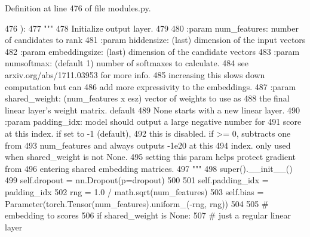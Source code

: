 Definition at line 476 of file modules.\+py.


\begin{DoxyCode}
476     ):
477         \textcolor{stringliteral}{"""}
478 \textcolor{stringliteral}{        Initialize output layer.}
479 \textcolor{stringliteral}{}
480 \textcolor{stringliteral}{        :param num\_features:  number of candidates to rank}
481 \textcolor{stringliteral}{        :param hiddensize:    (last) dimension of the input vectors}
482 \textcolor{stringliteral}{        :param embeddingsize: (last) dimension of the candidate vectors}
483 \textcolor{stringliteral}{        :param numsoftmax:   (default 1) number of softmaxes to calculate.}
484 \textcolor{stringliteral}{                              see arxiv.org/abs/1711.03953 for more info.}
485 \textcolor{stringliteral}{                              increasing this slows down computation but can}
486 \textcolor{stringliteral}{                              add more expressivity to the embeddings.}
487 \textcolor{stringliteral}{        :param shared\_weight: (num\_features x esz) vector of weights to use as}
488 \textcolor{stringliteral}{                              the final linear layer's weight matrix. default}
489 \textcolor{stringliteral}{                              None starts with a new linear layer.}
490 \textcolor{stringliteral}{        :param padding\_idx:   model should output a large negative number for}
491 \textcolor{stringliteral}{                              score at this index. if set to -1 (default),}
492 \textcolor{stringliteral}{                              this is disabled. if >= 0, subtracts one from}
493 \textcolor{stringliteral}{                              num\_features and always outputs -1e20 at this}
494 \textcolor{stringliteral}{                              index. only used when shared\_weight is not None.}
495 \textcolor{stringliteral}{                              setting this param helps protect gradient from}
496 \textcolor{stringliteral}{                              entering shared embedding matrices.}
497 \textcolor{stringliteral}{        """}
498         super().\_\_init\_\_()
499         self.dropout = nn.Dropout(p=dropout)
500 
501         self.padding\_idx = padding\_idx
502         rng = 1.0 / math.sqrt(num\_features)
503         self.bias = Parameter(torch.Tensor(num\_features).uniform\_(-rng, rng))
504 
505         \textcolor{comment}{# embedding to scores}
506         \textcolor{keywordflow}{if} shared\_weight \textcolor{keywordflow}{is} \textcolor{keywordtype}{None}:
507             \textcolor{comment}{# just a regular linear layer}

\end{DoxyCode}
